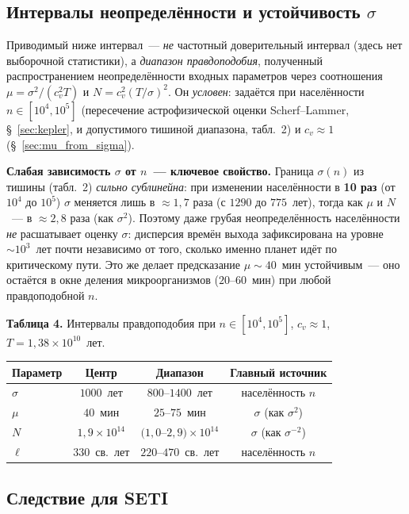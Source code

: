 \documentclass[12pt,a4paper]{article}
\begin{document}
\subsection{Интервалы неопределённости и устойчивость $\sigma$}
\label{sec:intervals}

Приводимый ниже интервал~--- \emph{не} частотный доверительный интервал (здесь нет выборочной статистики), а \emph{диапазон правдоподобия}, полученный распространением неопределённости входных параметров через соотношения $\mu=\sigma^2/(c_v^2T)$ и $N=c_v^2(T/\sigma)^2$. Он \emph{условен}: задаётся при населённости $n\in[10^4,10^5]$ (пересечение астрофизической оценки Scherf--Lammer, \S~\ref{sec:kepler}, и допустимого тишиной диапазона, табл.~2) и $c_v\approx1$ (\S~\ref{sec:mu_from_sigma}).

\textbf{Слабая зависимость $\sigma$ от $n$~--- ключевое свойство.} Граница $\sigma(n)$ из тишины (табл.~2) \emph{сильно сублинейна}: при изменении населённости в \textbf{10 раз} (от $10^4$ до $10^5$) $\sigma$ меняется лишь в $\approx1{,}7$ раза (с $1290$ до $775$~лет), тогда как $\mu$ и $N$~--- в $\approx2{,}8$ раза (как $\sigma^2$). Поэтому даже грубая неопределённость населённости \emph{не} расшатывает оценку $\sigma$: дисперсия времён выхода зафиксирована на уровне $\sim10^3$~лет почти независимо от того, сколько именно планет идёт по критическому пути. Это же делает предсказание $\mu\sim40$~мин устойчивым~--- оно остаётся в окне деления микроорганизмов ($20$--$60$~мин) при любой правдоподобной $n$.

\begin{center}
\textbf{Таблица 4.} Интервалы правдоподобия при $n\in[10^4,10^5]$, $c_v\approx1$, $T=1{,}38\times10^{10}$~лет.

\medskip
\begin{tabular}{l c c c}
\hline
Параметр & Центр & Диапазон & Главный источник \\
\hline
$\sigma$ & $1000$~лет & $800$--$1400$~лет & населённость $n$ \\
$\mu$ & $40$~мин & $25$--$75$~мин & $\sigma$ (как $\sigma^2$) \\
$N$ & $1{,}9\times10^{14}$ & $(1{,}0$--$2{,}9)\times10^{14}$ & $\sigma$ (как $\sigma^{-2}$) \\
$\ell$ & $330$~св.~лет & $220$--$470$~св.~лет & населённость $n$ \\
\hline
\end{tabular}
\end{center}

\subsection{Следствие для SETI}
\label{sec:seti}
\end{document}
